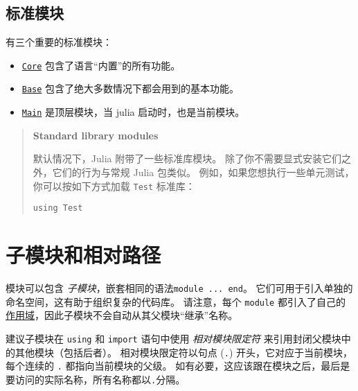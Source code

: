 \hypertarget{2129272965593313585}{}


\subsection{标准模块}



有三个重要的标准模块：



\begin{itemize}
\item \hyperlink{14876339894285762624}{\texttt{Core}} 包含了语言“内置”的所有功能。


\item \hyperlink{464144976511314225}{\texttt{Base}} 包含了绝大多数情况下都会用到的基本功能。


\item \href{@ref}{\texttt{Main}} 是顶层模块，当 julia 启动时，也是当前模块。

\end{itemize}


\begin{quote}
\textbf{Standard library modules}

默认情况下，Julia 附带了一些标准库模块。 除了你不需要显式安装它们之外，它们的行为与常规 Julia 包类似。 例如，如果您想执行一些单元测试，你可以按如下方式加载 \texttt{Test} 标准库：


\begin{verbatim}
using Test
\end{verbatim}

\end{quote}


\hypertarget{3656127271295886220}{}


\section{子模块和相对路径}



模块可以包含 \emph{子模块}，嵌套相同的语法\texttt{module ... end}。 它们可用于引入单独的命名空间，这有助于组织复杂的代码库。 请注意，每个 \texttt{module} 都引入了自己的 \hyperlink{11957539949537805757}{作用域}，因此子模块不会自动从其父模块“继承”名称。



建议子模块在 \texttt{using} 和 \texttt{import} 语句中使用 \emph{相对模块限定符} 来引用封闭父模块中的其他模块（包括后者）。 相对模块限定符以句点 (\texttt{.}) 开头，它对应于当前模块，每个连续的 \texttt{.} 都指向当前模块的父级。 如有必要，这应该跟在模块之后，最后是要访问的实际名称，所有名称都以\texttt{.}分隔。



